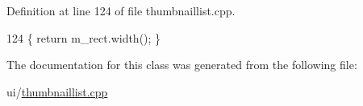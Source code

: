 Definition at line 124 of file thumbnaillist.\+cpp.


\begin{DoxyCode}
124 \{ \textcolor{keywordflow}{return} m\_rect.width(); \}
\end{DoxyCode}


The documentation for this class was generated from the following file\+:\begin{DoxyCompactItemize}
\item 
ui/\hyperlink{thumbnaillist_8cpp}{thumbnaillist.\+cpp}\end{DoxyCompactItemize}

